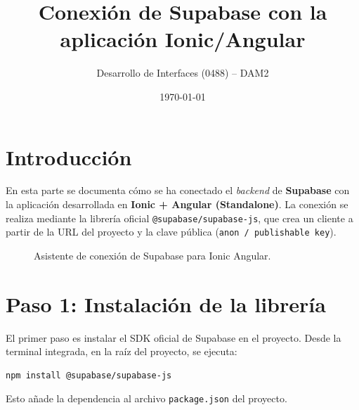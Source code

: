 \documentclass[11pt,a4paper]{article}
\title{Conexión de Supabase con la aplicación Ionic/Angular}
\author{Desarrollo de Interfaces (0488) -- DAM2}
\date{\today}
\begin{document}
\maketitle

\section{Introducción}

En esta parte se documenta cómo se ha conectado el \textit{backend} de
\textbf{Supabase} con la aplicación desarrollada en \textbf{Ionic + Angular
(Standalone)}. La conexión se realiza mediante la librería oficial
\texttt{@supabase/supabase-js}, que crea un cliente a partir de la URL del
proyecto y la clave pública (\texttt{anon / publishable key}).

\begin{figure}[H]
  \centering
  \caption{Asistente de conexión de Supabase para Ionic Angular.}
  \label{fig:panel-connect}
\end{figure}

\section{Paso 1: Instalación de la librería}

El primer paso es instalar el SDK oficial de Supabase en el proyecto. Desde la
terminal integrada, en la raíz del proyecto, se ejecuta:

\begin{lstlisting}[language=bash,caption={Instalación del cliente de Supabase}]
npm install @supabase/supabase-js
\end{lstlisting}

Esto añade la dependencia al archivo \texttt{package.json} del proyecto.
\end{document}
